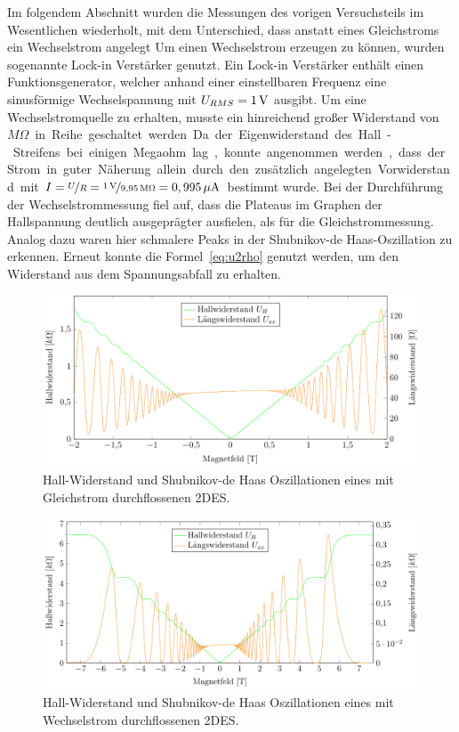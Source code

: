 
Im folgendem Abschnitt wurden die Messungen des vorigen Versuchsteils im Wesentlichen wiederholt, mit dem Unterschied, dass anstatt eines Gleichstroms ein Wechselstrom angelegt %
 Um einen Wechselstrom erzeugen zu können, wurden sogenannte Lock-in Verstärker genutzt. Ein Lock-in Verstärker enthält einen Funktionsgenerator, welcher anhand einer einstellbaren Frequenz eine sinusförmige Wechselspannung mit $U_{RMS}=\unit[1]{V}$ ausgibt. Um eine Wechselstromquelle zu erhalten, musste ein hinreichend großer Widerstand von \unit[9,95]{$M\Omega$} in Reihe geschaltet werden.
 Da der Eigenwiderstand des Hall-Streifens bei einigen Megaohm lag, konnte angenommen werden, dass der Strom in guter Näherung allein durch den zusätzlich angelegten Vorwiderstand mit  $I=\nicefrac{U}{R}=\nicefrac{\unit[1]{V}}{\unit[9,95]{M\Omega}}=\unit[0,995]{\mu A}$ bestimmt wurde. 
 Bei der Durchführung der Wechselstrommessung fiel auf, dass die Plateaus im Graphen der Hallspannung %
 deutlich ausgeprägter ausfielen, als für die Gleichstrommessung. Analog dazu waren hier schmalere Peaks in der Shubnikov-de Haas-Oszillation zu erkennen.  
 Erneut konnte die Formel~\eqref{eq:u2rho} genutzt werden, um den Widerstand aus dem Spannungsabfall zu erhalten. %

\begin{figure}[h]
	\centering
	\includegraphics{graphs/ac/pm2T_range.pdf}
	\caption[Höher aufgelöste Gleichstrommessung in Magnetfeldteilbereich]{
		Hall-Widerstand und Shubnikov-de Haas Oszillationen eines mit Gleichstrom durchflossenen 2DES.
	}
	\label{fig:2T_range_ac}
\end{figure}


\begin{figure}[h]
	\centering
	\includegraphics{graphs/ac/full_range.pdf}
	\caption[Wechselstrommessung im maximalen Magnetfeldbereich]{
		Hall-Widerstand und Shubnikov-de Haas Oszillationen eines mit Wechselstrom durchflossenen 2DES.
	}
	\label{fig:full_range_ac}
\end{figure}


